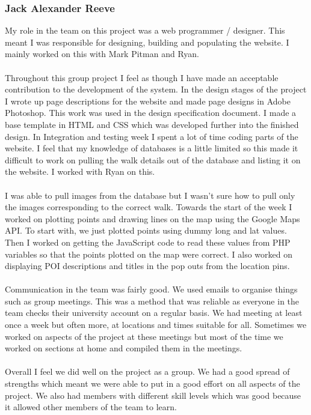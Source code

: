 \documentclass[12pt]{article}
\begin{document}
\subsubsection{Jack Alexander Reeve}
My role in the team on this project was a web programmer / designer. This meant I was responsible for designing, building and populating the website. I mainly worked on this with Mark Pitman and Ryan.
~\\\\
Throughout this group project I feel as though I have made an acceptable contribution to the development of the system. In the design stages of the project I wrote up page descriptions for the website and made page designs in Adobe Photoshop. This work was used in the design specification document. I made a base template in HTML and CSS which was developed further into the finished design. In Integration and testing week I
spent a lot of time coding parts of the website. I feel that my knowledge of databases is a little limited so this made it difficult to work on pulling the walk details out of the database and listing it on the website. I worked with Ryan on this.
~\\\\
I was able to pull images from the database but I wasn't sure how to pull only the images corresponding to the correct walk. Towards the start of the week I worked on plotting points and drawing lines on the map using the Google Maps API. To start with, we just plotted points using dummy long and lat values. Then I worked on getting the JavaScript code to read these values from PHP variables so that the points plotted on the map were correct. I also worked on displaying POI descriptions and titles in the pop outs from the location pins.
~\\\\
Communication in the team was fairly good. We used emails to organise things such as group meetings. This was a method that was reliable as everyone in the team checks their university account on a regular basis. We had meeting at least once a week but often more, at locations and times suitable for all. Sometimes we worked on aspects of the project at these meetings but most of the time we worked on sections at home and
compiled them in the meetings.
~\\\\
Overall I feel we did well on the project as a group. We had a good spread of strengths which meant we were able to put in a good effort on all aspects of the project. We also had members with different skill levels which was good because it allowed other members of the team to learn.
\end{document}
